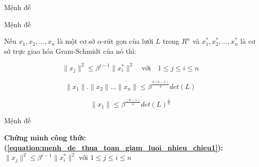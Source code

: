 \documentclass{beamer}
\numberwithin{equation}{section}
\begin{document}
\begin{frame}{Mệnh đề}

\begin{block}{Mệnh đề}

Nếu $x_1, x_2, \dots, x_n$ là một cơ sở $\alpha$-rút gọn của lưới $L$ trong $R^n$
và $x_1^*, x_2^*, \dots, x_n^*$ là cơ sở trực giao hóa Gram-Schmidt của nó thì:

\begin{equation} \label{equation:menh_de_thua_toan_giam_luoi_nhieu_chieu1}
\|x_j\|^2 \leq \beta^{i-1}\|x_i^*\|^2 \quad \text{với} \quad 1 \leq j \leq i \leq n
\end{equation}

\begin{equation} \label{equation:menh_de_thua_toan_giam_luoi_nhieu_chieu2}
\|x_1\|.\|x_2\|\dots\|x_n\| \leq \beta^{\tfrac{n(n-1)}{4}}det(L)
\end{equation}

\begin{equation} \label{equation:menh_de_thua_toan_giam_luoi_nhieu_chieu3}
\|x_1\| \leq \beta^{\tfrac{(n-1)}{4}}det(L)^{\frac{1}{n}}
\end{equation}

\end{block}

\end{frame}
\begin{frame}{Mệnh đề}

\textbf{Chứng minh công thức (\ref{equation:menh_de_thua_toan_giam_luoi_nhieu_chieu1}):}
$\|x_j\|^2 \leq \beta^{i-1}\|x_i^*\|^2$ với $1 \leq j \leq i \leq n $


\end{frame}
\end{document}
